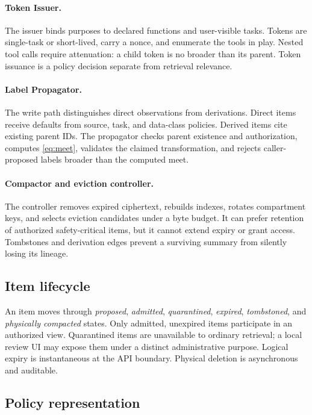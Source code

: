 \paragraph{Token Issuer.}
The issuer binds purposes to declared functions and user-visible tasks. Tokens are single-task or short-lived, carry a nonce, and enumerate the tools in play. Nested tool calls require attenuation: a child token is no broader than its parent. Token issuance is a policy decision separate from retrieval relevance.

\paragraph{Label Propagator.}
The write path distinguishes direct observations from derivations. Direct items receive defaults from source, task, and data-class policies. Derived items cite existing parent IDs. The propagator checks parent existence and authorization, computes \cref{eq:meet}, validates the claimed transformation, and rejects caller-proposed labels broader than the computed meet.

\paragraph{Compactor and eviction controller.}
The controller removes expired ciphertext, rebuilds indexes, rotates compartment keys, and selects eviction candidates under a byte budget. It can prefer retention of authorized safety-critical items, but it cannot extend expiry or grant access. Tombstones and derivation edges prevent a surviving summary from silently losing its lineage.

\subsection{Item lifecycle}

An item moves through \emph{proposed}, \emph{admitted}, \emph{quarantined}, \emph{expired}, \emph{tombstoned}, and \emph{physically compacted} states. Only admitted, unexpired items participate in an authorized view. Quarantined items are unavailable to ordinary retrieval; a local review UI may expose them under a distinct administrative purpose. Logical expiry is instantaneous at the API boundary. Physical deletion is asynchronous and auditable.



\subsection{Policy representation}

